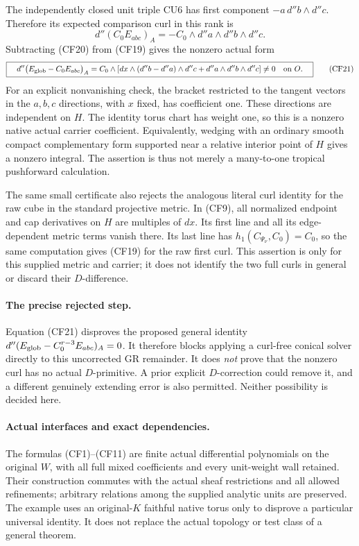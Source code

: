 The independently closed unit triple CU6 has first component
$-a\,d''b\wedge d''c$.  Therefore its expected comparison
curl in this rank is
\[
                d''(C_0E_{abc})_A
                   =-C_0\wedge d''a\wedge d''b\wedge d''c.
 \tag{CF20}
\]
Subtracting (CF20) from (CF19) gives the nonzero actual form
\[
 \boxed{\quad
 d''\bigl(E_{\rm glob}-C_0E_{abc}\bigr)_A
 =C_0\wedge
   \left[dx\wedge(d''b-d''a)\wedge d''c
                         +d''a\wedge d''b\wedge d''c\right]
                         \ne0\quad\text{on }O.
 \quad}
 \tag{CF21}
\]
For an explicit nonvanishing check, the bracket restricted to
the tangent vectors in the $a,b,c$ directions, with $x$ fixed,
has coefficient one.  These directions are independent on
$H$.  The identity torus chart has weight one, so this is a
nonzero native actual carrier coefficient.  Equivalently,
wedging with an ordinary smooth compact complementary form
supported near a relative interior point of $H$ gives a
nonzero integral.  The assertion is thus not merely a
many-to-one tropical pushforward calculation.

The same small certificate also rejects the analogous literal
curl identity for the raw cube in the standard projective
metric.  In (CF9), all normalized endpoint and cap derivatives
on $H$ are multiples of $dx$.  Its first line and all its
edge-dependent metric terms vanish there.  Its last line
has $h_1(C_{\Psi_\nu},C_0)=C_0$, so the same computation
gives (CF19) for the raw first curl.  This assertion is only
for this supplied metric and carrier; it does not identify
the two full curls in general or discard their $D$-difference.

\paragraph{The precise rejected step.}
Equation (CF21) disproves the proposed general identity
$d''(E_{\rm glob}-C_0^{r-3}E_{abc})_A=0$.
It therefore blocks applying a curl-free conical solver
directly to this uncorrected GR remainder.  It does
\emph{not} prove that the nonzero curl has no actual
$D$-primitive.  A prior explicit $D$-correction could remove
it, and a different genuinely extending error is also
permitted.  Neither possibility is decided here.

\paragraph{Actual interfaces and exact dependencies.}
The formulas (CF1)--(CF11) are finite actual differential
polynomials on the original $W$, with all full mixed
coefficients and every unit-weight wall retained.  Their
construction commutes with the actual sheaf restrictions
and all allowed refinements; arbitrary relations among
the supplied analytic units are preserved.  The example
uses an original-$K$ faithful native torus only to disprove
a particular universal identity.  It does not replace
the actual topology or test class of a general theorem.

